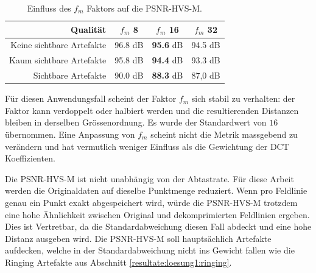 \begin{table}[!htbp]
\center
\begin{tabular}{r|c|c|c}
	Qualität &$f_m$ 8 &$f_m$ 16 &$f_m$ 32 \\\hline
	Keine sichtbare Artefakte & 96.8 dB & \textbf{95.6} dB& 94.5 dB \\
	Kaum sichtbare Artefakte & 95.8 dB & \textbf{94.4} dB& 93.3 dB\\
  Sichtbare Artefakte & 90.0 dB & \textbf{88.3} dB & 87,0 dB
\end{tabular}
\caption{Einfluss des $f_m$ Faktors auf die PSNR-HVS-M.}
\label{testsetup:psnr:umsetzung:tabelle:f_m}
\end{table}
Für diesen Anwendungsfall scheint der Faktor $f_m$ sich stabil zu verhalten: der Faktor kann verdoppelt oder halbiert werden und die resultierenden Distanzen bleiben in derselben Grössenordnung. Es wurde der Standardwert von $16$ übernommen. Eine Anpassung von $f_m$ scheint nicht die Metrik massgebend zu verändern und hat vermutlich weniger Einfluss als die Gewichtung der DCT Koeffizienten.

Die PSNR-HVS-M ist nicht unabhängig von der Abtastrate. Für diese Arbeit werden die Originaldaten auf dieselbe Punktmenge reduziert. Wenn pro Feldlinie genau ein Punkt exakt abgespeichert wird, würde die PSNR-HVS-M trotzdem eine hohe Ähnlichkeit zwischen Original und dekomprimierten Feldlinien ergeben. Dies ist Vertretbar, da die Standardabweichung diesen Fall abdeckt und eine hohe Distanz ausgeben wird. Die PSNR-HVS-M soll hauptsächlich Artefakte aufdecken, welche in der Standardabweichung nicht ins Gewicht fallen wie die Ringing Artefakte aus Abschnitt \ref{resultate:loesung1:ringing}.